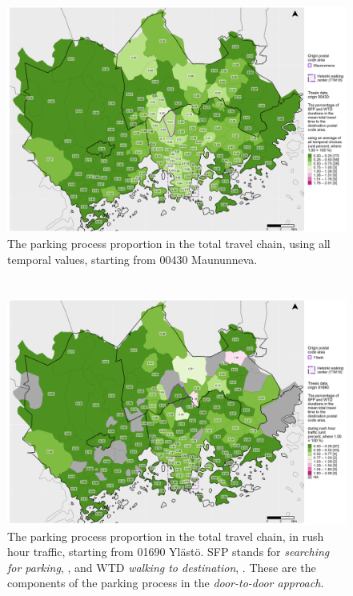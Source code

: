 \begin{figure}
    \section{}
    \centering
    \includegraphics[trim={0.9cm 0.3cm 0.25cm 0.3cm},clip,width=\textwidth]{images/compare_traveltimes_mapfill-msc_all_pct_fromzip-00430_16-10-2020.png}
    \caption[Parking process proportion from Maununneva, all temporal values]{The parking process proportion in the total travel chain, using all temporal values, starting from 00430 Maununneva.}%
    \label{fig:compare_msc_all_pct_00430}%
\end{figure}

\begin{figure}
    \section{}
    \centering
    \includegraphics[trim={0.9cm 0.3cm 0.25cm 0.3cm},clip,width=\textwidth]{images/compare_traveltimes_mapfill-msc_r_pct_fromzip-01690_16-10-2020.png}
    \caption[Parking process proportion from Ylästö, rush hour traffic]{The parking process proportion in the total travel chain, in rush hour traffic, starting from 01690 Ylästö. SFP stands for \textit{searching for parking}, , and WTD \textit{walking to destination}, . These are the components of the parking process in the \textit{door-to-door approach}.}%
    \label{fig:compare_msc_r_pct_01690}%
\end{figure}

